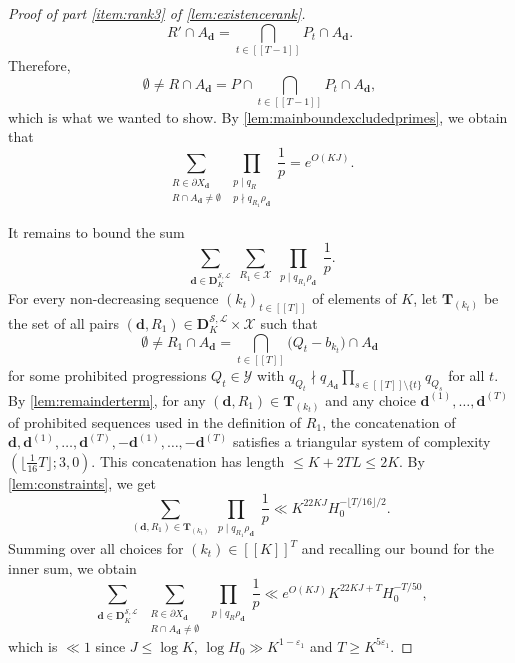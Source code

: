 \documentclass[11pt]{amsart}
\theoremstyle{definition}
\renewcommand{\leq}{\leqslant}
\renewcommand{\geq}{\geqslant}
\newcommand{\sinterval}[1]{[\![#1]\!] }
\newcommand{\eps}{\varepsilon}
\renewcommand{\d}{\boldsymbol{d}}
\newcommand{\cstH}{\eps_1}
\newcommand{\rankcutoff}{\repK^{5\cstH}}
\newcommand{\sommespart}{b}
\newcommand{\fprod}[1]{\rho_{#1}}
\newcommand{\pall}{\fprod{\d}}
\newcommand{\progression}{A_{\d}}
\newcommand{\lit}{\mathcal{L}}
\newcommand{\s}{\mathcal{S}}
\newcommand{\fancyD}{\mathbf{D}}
\newcommand{\Dss}{\fancyD^{\s,\lit}_{\!\repK}}
\newcommand{\elln}{L}
\newcommand{\prohibprog}{\mathcal{Y}}
\newcommand{\modulus}{q}
\newcommand{\XX}{\mathbf{T}}
\newcommand{\Xd}{X_{\d}}
\newcommand{\repR}{J}
\newcommand{\repK}{K}
\newcommand{\ncond}{T}
\begin{document}
\begin{proof}[Proof of part \cref{item:rank3} of \cref{lem:existencerank}]
\begin{equation*}
	R' \cap \progression = \bigcap_{t\in \sinterval{\ncond-1}} P_t \cap \progression.
\end{equation*}
Therefore, 
\begin{equation*}
	\emptyset\neq R\cap \progression = P\cap \bigcap_{t\in \sinterval{\ncond-1}} P_t \cap \progression, 
\end{equation*}
which is what we wanted to show. By \cref{lem:mainboundexcludedprimes}, we obtain that 
\begin{equation*}
	 \sum_{\substack{R\in \partial\Xd \\ R\cap \progression \neq \emptyset}} \prod_{\substack{p\mid \modulus_{R}\\ p\nmid \modulus_{R_1}\! \pall}}\frac{1}{p} = e^{O(\repK\repR)}.
\end{equation*}

It remains to bound the sum
\begin{equation*}
	 \sum_{\substack{\d\in \Dss}} \sum_{R_1\in \mathcal{X}}  \prod_{\substack{p\mid \modulus_{R_1}\! \pall}}\frac{1}{p}.
\end{equation*}
For every non-decreasing sequence $(k_t)_{t\in \sinterval{\ncond}}$ of elements of $\repK$, let $\XX_{(k_t)}$ be the set of all pairs $(\d, R_1)\in \Dss\times \mathcal{X}$ such that 
\begin{equation*}
	\emptyset \neq R_1 \cap \progression = \bigcap_{t\in \sinterval{\ncond}} \big(Q_t - \sommespart_{k_t}\big) \cap \progression
\end{equation*}
for some prohibited progressions $Q_t\in \prohibprog$ with $\modulus_{Q_t} \nmid \modulus_{\progression}\prod_{s\in \sinterval{\ncond}\setminus \{t\}}\modulus_{Q_s}$ for all $t$. By \cref{lem:remainderterm}, for any $(\d, R_1)\in \XX_{(k_t)}$ and any choice $\d^{(1)}, \ldots, \d^{(\ncond)}$ of prohibited sequences used in the definition of $R_1$, the concatenation of $\d, \d^{(1)}, \ldots, \d^{(\ncond)}, -\d^{(1)}, \ldots, -\d^{(\ncond)}$ satisfies a triangular system of complexity $(\lfloor \tfrac{1}{16}\ncond\rfloor; 3, 0)$. This concatenation has length $\leq \repK + 2\ncond \elln \leq 2\repK$. By \cref{lem:constraints}, we get
\begin{equation*}
	\sum_{(\d, R_1)\in \XX_{(k_t)}}  \prod_{\substack{p\mid \modulus_{R_1}\! \pall}}\frac{1}{p} \ll \repK^{22\repK\repR} H_0^{-\lfloor \ncond/16\rfloor /2}.
\end{equation*}
Summing over all choices for $(k_t)\in \sinterval{\repK}^{\ncond}$ and recalling our bound for the inner sum, we obtain
\begin{equation*}
	\sum_{\substack{\d\in \Dss}} \sum_{\substack{R\in \partial\Xd \\ R\cap \progression \neq \emptyset}} \prod_{\substack{p\mid \modulus_{R} \pall}}\frac{1}{p}  \ll e^{O(\repK\repR)}  \repK^{22\repK\repR+\ncond } H_0^{-\ncond/50},
\end{equation*}
which is $\ll 1$ since $\repR \leq \log \repK$, ${\log H_0 \gg\repK^{1-\cstH}}$ and $\ncond \geq \rankcutoff$.
\end{proof}
\end{document}
